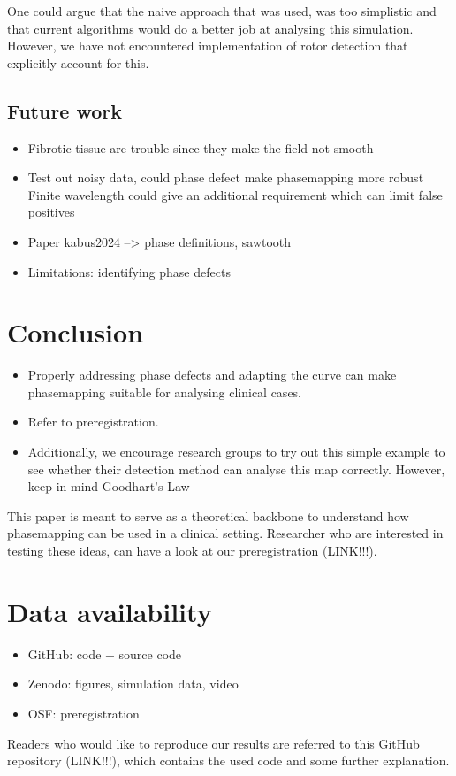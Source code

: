 \documentclass[twocolumn]{article}
\begin{document}
One could argue that the naive approach that was used, was too
simplistic and that current algorithms would do a better job at
analysing this simulation. However, we have not encountered
implementation of rotor detection that explicitly account for this.

\subsection{Future work}\label{future-work}

\begin{itemize}
\tightlist
\item
  Fibrotic tissue are trouble since they make the field not smooth
\item
  Test out noisy data, could phase defect make phasemapping more robust
  \autocite{tomii2021spatial} Finite wavelength could give an additional
  requirement which can limit false positives
\item
  Paper kabus2024 --\textgreater{} phase definitions, sawtooth
\item
  Limitations: identifying phase defects
\end{itemize}

\section{Conclusion}\label{conclusion}

\begin{itemize}
\tightlist
\item
  Properly addressing phase defects and adapting the curve can make
  phasemapping suitable for analysing clinical cases.
\item
  Refer to preregistration.
\item
  Additionally, we encourage research groups to try out this simple
  example to see whether their detection method can analyse this map
  correctly. However, keep in mind Goodhart's Law
\end{itemize}

This paper is meant to serve as a theoretical backbone to understand how
phasemapping can be used in a clinical setting. Researcher who are
interested in testing these ideas, can have a look at our
preregistration (LINK!!!).

\section{Data availability}\label{data-availability}

\begin{itemize}
\tightlist
\item
  GitHub: code + source code
\item
  Zenodo: figures, simulation data, video
\item
  OSF: preregistration
\end{itemize}

Readers who would like to reproduce our results are referred to this
GitHub repository (LINK!!!), which contains the used code and some
further explanation.

\printbibliography
\end{document}

